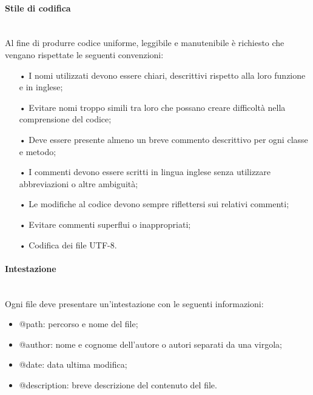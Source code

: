 \paragraph{Stile di codifica}\mbox{}\\
Al fine di produrre codice uniforme, leggibile e manutenibile è richiesto che vengano rispettate
le seguenti convenzioni:
\begin{itemize}
\item[•] I nomi utilizzati devono essere chiari, descrittivi rispetto alla loro funzione e in inglese;
\item[•] Evitare nomi troppo simili tra loro che possano creare difficoltà nella comprensione del codice;
\item[•] Deve essere presente almeno un breve commento descrittivo per ogni classe e metodo;
\item[•] I commenti devono essere scritti in lingua inglese senza utilizzare abbreviazioni o altre ambiguità;
\item[•] Le modifiche al codice devono sempre riflettersi sui relativi commenti;
\item[•] Evitare commenti superflui o  inappropriati;
\item[•] Codifica dei file UTF-8.
\end{itemize}

 \paragraph{Intestazione}\mbox{}\\
Ogni file deve presentare un'intestazione con le seguenti informazioni:
\begin{itemize}
\item @path: percorso e nome del file;
\item @author: nome e cognome dell'autore o autori separati da una virgola;
\item @date: data ultima modifica;
\item @description: breve descrizione del contenuto del file.
\end{itemize}

